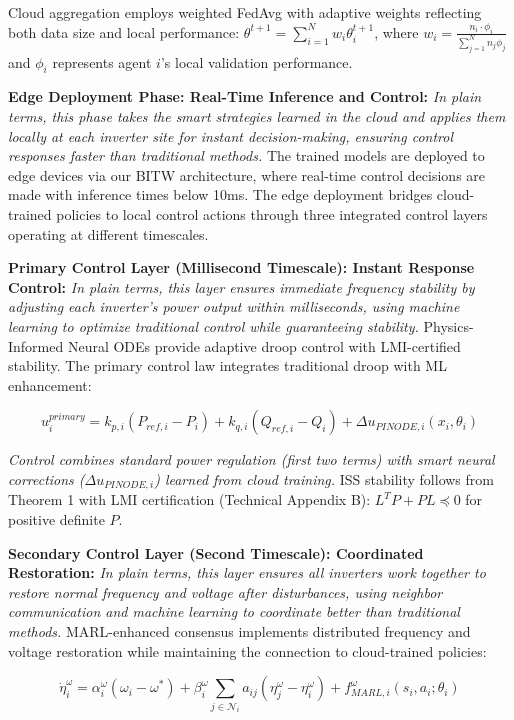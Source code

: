 \documentclass[12pt]{article}
\begin{document}
Cloud aggregation employs weighted FedAvg with adaptive weights reflecting both data size and local performance: $\theta^{t+1} = \sum_{i=1}^N w_i \theta_i^{t+1}$, where $w_i = \frac{n_i \cdot \phi_i}{\sum_{j=1}^N n_j \phi_j}$ and $\phi_i$ represents agent $i$'s local validation performance.

\textbf{Edge Deployment Phase: Real-Time Inference and Control:} \textit{In plain terms, this phase takes the smart strategies learned in the cloud and applies them locally at each inverter site for instant decision-making, ensuring control responses faster than traditional methods.} The trained models are deployed to edge devices via our BITW architecture, where real-time control decisions are made with inference times below 10ms. The edge deployment bridges cloud-trained policies to local control actions through three integrated control layers operating at different timescales.

\textbf{Primary Control Layer (Millisecond Timescale): Instant Response Control:} \textit{In plain terms, this layer ensures immediate frequency stability by adjusting each inverter's power output within milliseconds, using machine learning to optimize traditional control while guaranteeing stability.} Physics-Informed Neural ODEs provide adaptive droop control with LMI-certified stability. The primary control law integrates traditional droop with ML enhancement:

$$u_i^{primary} = k_{p,i}(P_{ref,i} - P_i) + k_{q,i}(Q_{ref,i} - Q_i) + \Delta u_{PINODE,i}(x_i, \theta_i)$$

\textit{Control combines standard power regulation (first two terms) with smart neural corrections ($\Delta u_{PINODE,i}$) learned from cloud training.} ISS stability follows from Theorem 1 with LMI certification (Technical Appendix B): $L^T P + PL \preceq 0$ for positive definite $P$.

\textbf{Secondary Control Layer (Second Timescale): Coordinated Restoration:} \textit{In plain terms, this layer ensures all inverters work together to restore normal frequency and voltage after disturbances, using neighbor communication and machine learning to coordinate better than traditional methods.} MARL-enhanced consensus implements distributed frequency and voltage restoration while maintaining the connection to cloud-trained policies:

$$\dot{\eta}_i^{\omega} = \alpha_i^{\omega}(\omega_i - \omega^*) + \beta_i^{\omega} \sum_{j \in \mathcal{N}_i} a_{ij}(\eta_j^{\omega} - \eta_i^{\omega}) + f_{MARL,i}^{\omega}(s_i, a_i; \theta_i)$$
\end{document}
